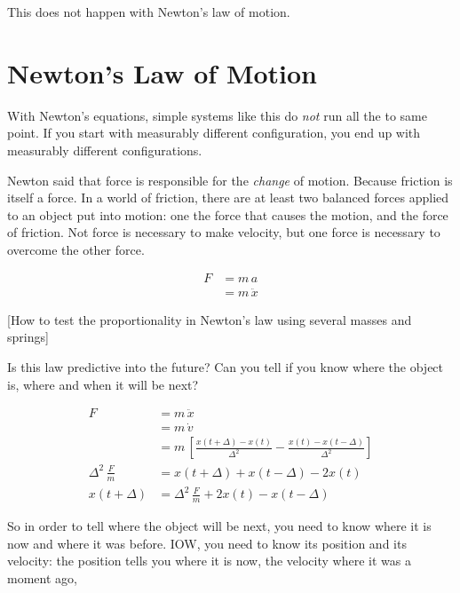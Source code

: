 \documentclass[pagesize,headsepline,10pt,parskip=half]{scrreprt}
\begin{document}
      This does not happen with Newton's law of motion.
      
    \section{Newton's Law of Motion}
      With Newton's equations, simple systems like this do \emph{not}
      run all the to same point. If you start with measurably different
      configuration, you end up with measurably different configurations.
    
      Newton said that force is responsible for the \emph{change} of motion.
      Because friction is itself a force. In a world of friction, there are at
      least two balanced forces applied to an object put into motion: one the
      force that causes the motion, and the force of friction.  Not force is
      necessary to make velocity, but one force is necessary to overcome the
      other force.
      
      \begin{align*}
        F &= m\,a \\
          &= m\,\ddot{x}
      \end{align*}
      
      [How to test the proportionality in Newton's law using several
      masses and springs]
      
      Is this law predictive into the future?  Can you tell if you
      know where the object is, where and when it will be next?

      \begin{align*}
        F &= m\,\ddot{x} \\
          &= m\,\dot{v} \\
          &= m\,\left[\frac{x(t + \Delta) - x(t)}{\Delta^2} - \frac{x(t) - x(t
          - \Delta)}{\Delta^2} \right] \\
        \Delta^2\,\frac{F}{m} &= x(t + \Delta) + x(t - \Delta) - 2x(t) \\
        x(t + \Delta) &= \Delta^2\,\frac{F}{m} + 2x(t) - x(t - \Delta)
      \end{align*}
      
      So in order to tell where the object will be next, you need to know where
      it is now and where it was before.  IOW, you need to know its position and
      its velocity: the position tells you where it is now, the velocity where
      it was a moment ago,
\end{document}
